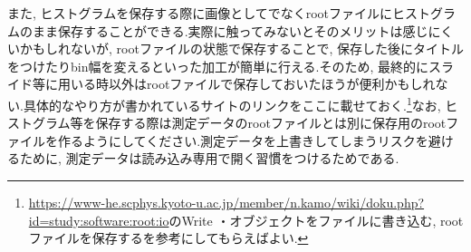また, ヒストグラムを保存する際に画像としてでなくrootファイルにヒストグラムのまま保存することができる.実際に触ってみないとそのメリットは感じにくいかもしれないが, rootファイルの状態で保存することで, 保存した後にタイトルをつけたりbin幅を変えるといった加工が簡単に行える.そのため, 最終的にスライド等に用いる時以外はrootファイルで保存しておいたほうが便利かもしれない.具体的なやり方が書かれているサイトのリンクをここに載せておく.\footnote{\url{https://www-he.scphys.kyoto-u.ac.jp/member/n.kamo/wiki/doku.php?id=study:software:root:io}のWrite ・オブジェクトをファイルに書き込む, rootファイルを保存するを参考にしてもらえばよい.}なお, ヒストグラム等を保存する際は測定データのrootファイルとは別に保存用のrootファイルを作るようにしてください.測定データを上書きしてしまうリスクを避けるために, 測定データは読み込み専用で開く習慣をつけるためである.

